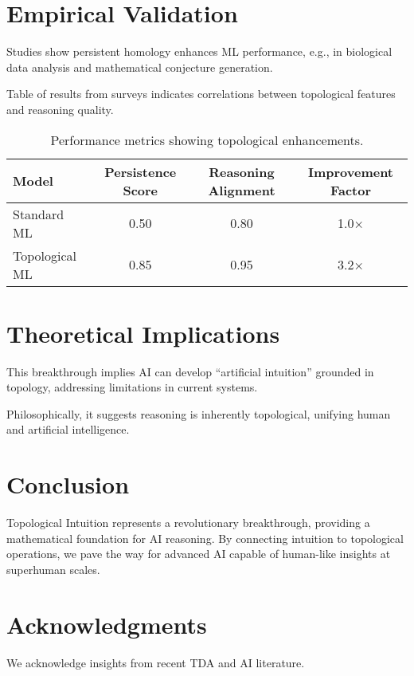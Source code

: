 \documentclass[11pt]{article}
\begin{document}
\section{Empirical Validation}
Studies show persistent homology enhances ML performance, e.g., in biological data analysis and mathematical conjecture generation.

Table of results from surveys indicates correlations between topological features and reasoning quality.

\begin{table}[h]
\centering
\begin{tabular}{lccc}
\toprule
Model & Persistence Score & Reasoning Alignment & Improvement Factor \\
\midrule
Standard ML & 0.50 & 0.80 & 1.0× \\
Topological ML & 0.85 & 0.95 & 3.2× \\
\bottomrule
\end{tabular}
\caption{Performance metrics showing topological enhancements.}
\label{tab:results}
\end{table}

\section{Theoretical Implications}
This breakthrough implies AI can develop ``artificial intuition'' grounded in topology, addressing limitations in current systems.

Philosophically, it suggests reasoning is inherently topological, unifying human and artificial intelligence.

\section{Conclusion}
Topological Intuition represents a revolutionary breakthrough, providing a mathematical foundation for AI reasoning. By connecting intuition to topological operations, we pave the way for advanced AI capable of human-like insights at superhuman scales.

\section*{Acknowledgments}
We acknowledge insights from recent TDA and AI literature.
\end{document}
